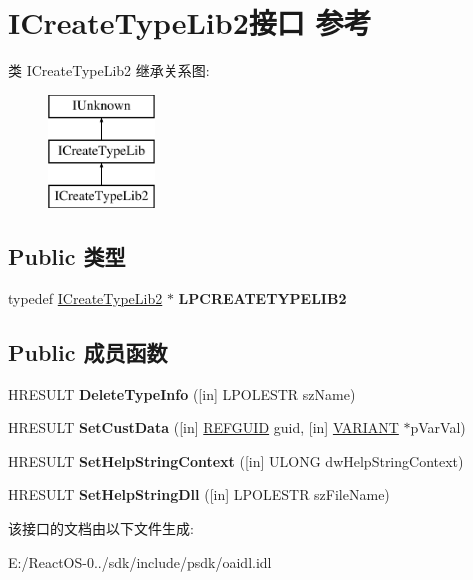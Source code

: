 \hypertarget{interface_i_create_type_lib2}{}\section{I\+Create\+Type\+Lib2接口 参考}
\label{interface_i_create_type_lib2}
类 I\+Create\+Type\+Lib2 继承关系图\+:\begin{figure}[H]
\begin{center}
\leavevmode
\includegraphics[height=3.000000cm]{interface_i_create_type_lib2}
\end{center}
\end{figure}
\subsection*{Public 类型}
\begin{DoxyCompactItemize}
\item 
\mbox{\label{interface_i_create_type_lib2_a8d31f0b07a22961b6b2a88c6786b833b}} 
typedef \hyperlink{interface_i_create_type_lib2}{I\+Create\+Type\+Lib2} $\ast$ {\bfseries L\+P\+C\+R\+E\+A\+T\+E\+T\+Y\+P\+E\+L\+I\+B2}
\end{DoxyCompactItemize}
\subsection*{Public 成员函数}
\begin{DoxyCompactItemize}
\item 
\mbox{\label{interface_i_create_type_lib2_a2f9c818bb9e2b86eeb0375e9a3a0bc17}} 
H\+R\+E\+S\+U\+LT {\bfseries Delete\+Type\+Info} (\mbox{[}in\mbox{]} L\+P\+O\+L\+E\+S\+TR sz\+Name)
\item 
\mbox{\label{interface_i_create_type_lib2_a31475c74b9d44451b3009dbdf54718c8}} 
H\+R\+E\+S\+U\+LT {\bfseries Set\+Cust\+Data} (\mbox{[}in\mbox{]} \hyperlink{struct___g_u_i_d}{R\+E\+F\+G\+U\+ID} guid, \mbox{[}in\mbox{]} \hyperlink{structtag_v_a_r_i_a_n_t}{V\+A\+R\+I\+A\+NT} $\ast$p\+Var\+Val)
\item 
\mbox{\label{interface_i_create_type_lib2_ad439bdc9472e7ad6c10bd8bbcd16a9b7}} 
H\+R\+E\+S\+U\+LT {\bfseries Set\+Help\+String\+Context} (\mbox{[}in\mbox{]} U\+L\+O\+NG dw\+Help\+String\+Context)
\item 
\mbox{\label{interface_i_create_type_lib2_a81b43d5a917ca9ae148585d24054f9cc}} 
H\+R\+E\+S\+U\+LT {\bfseries Set\+Help\+String\+Dll} (\mbox{[}in\mbox{]} L\+P\+O\+L\+E\+S\+TR sz\+File\+Name)
\end{DoxyCompactItemize}


该接口的文档由以下文件生成\+:\begin{DoxyCompactItemize}
\item 
E\+:/\+React\+O\+S-\/0../sdk/include/psdk/oaidl.\+idl\end{DoxyCompactItemize}
